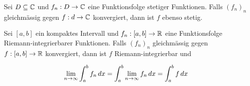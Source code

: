 \setcounter{thm}{47}
\begin{thm}
	\label{thm:gleichmaessige-konvergenz-und-stetigkeit} 
	Sei $D\subseteq \mathbb{C}$ und $f_n : D\to \mathbb{C}$ eine Funktionsfolge stetiger Funktionen. Falls $(f_n)_n$ gleichmässig gegen $f:d \to \mathbb{C}$ konvergiert, dann ist $f$ ebenso stetig.
\end{thm}

\begin{thm}
	Sei $[a,b]$ ein kompaktes Intervall und $f_n: [a,b] \to \mathbb{R}$ eine Funktionsfolge Riemann-integrierbarer Funktionen. Falls $(f_n)_n$ gleichmässig gegen $f:[a,b] \to \mathbb{R}$ konvergiert, dann ist $f$ Riemann-integrierbar und
	\begin{thm}
		\begin{equation}
			\lim_{n \to \infty} \int_{a}^{b} f_n \, dx = \int_{a}^{b} \lim_{n \to \infty} f_n \, dx = \int_{a}^{b} f \, dx
		\end{equation}
	\end{thm}
\end{thm}